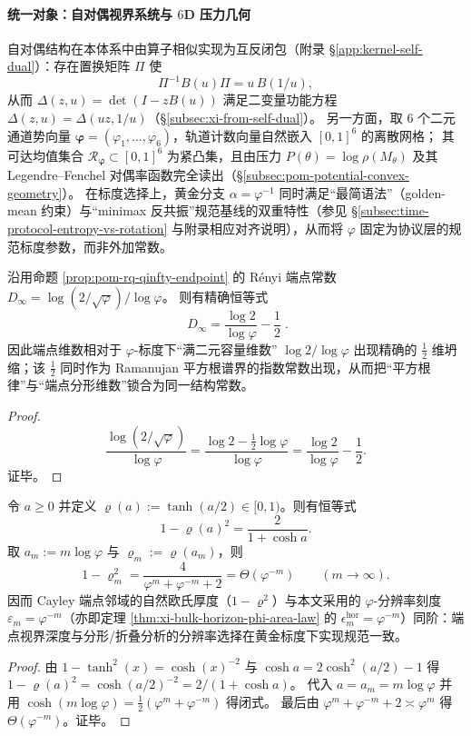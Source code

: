 \paragraph{统一对象：自对偶视界系统与 \(6\)D 压力几何}
自对偶结构在本体系中由算子相似实现为互反闭包（附录 \S\ref{app:kernel-self-dual}）：存在置换矩阵 \(\Pi\) 使
\[
\Pi^{-1}B(u)\Pi=u\,B(1/u),
\]
从而 \(\Delta(z,u)=\det(I-zB(u))\) 满足二变量功能方程 \(\Delta(z,u)=\Delta(uz,1/u)\)（\S\ref{subsec:xi-from-self-dual}）。
另一方面，取 \(6\) 个二元通道势向量 \(\boldsymbol{\varphi}=(\varphi_1,\dots,\varphi_6)\)，轨道计数向量自然嵌入 \([0,1]^6\) 的离散网格；
其可达均值集合 \(\mathcal{R}_{\boldsymbol{\varphi}}\subset[0,1]^6\) 为紧凸集，且由压力 \(P(\theta)=\log\rho(M_\theta)\) 及其 Legendre--Fenchel 对偶率函数完全读出（\S\ref{subsec:pom-potential-convex-geometry}）。
在标度选择上，黄金分支 \(\alpha=\varphi^{-1}\) 同时满足“最简语法”（golden-mean 约束）与“minimax 反共振”规范基线的双重特性（参见 \S\ref{subsec:time-protocol-entropy-vs-rotation} 与附录相应对齐说明），从而将 \(\varphi\) 固定为协议层的规范标度参数，而非外加常数。

\begin{corollary}\label{cor:discussion-ramanujan-half-dimension-collapse}
沿用命题 \ref{prop:pom-rq-qinfty-endpoint} 的 Rényi 端点常数
\(
D_\infty=\log(2/\sqrt{\varphi})/\log\varphi
\)。
则有精确恒等式
\[
\boxed{\;
D_\infty=\frac{\log 2}{\log\varphi}-\frac12\; }.
\]
因此端点维数相对于 \(\varphi\)-标度下“满二元容量维数” \(\log 2/\log\varphi\) 出现精确的 \(\tfrac12\) 维坍缩；该 \(\tfrac12\) 同时作为 Ramanujan 平方根谱界的指数常数出现，从而把“平方根律”与“端点分形维数”锁合为同一结构常数。
\end{corollary}
\begin{proof}
\[
\frac{\log(2/\sqrt{\varphi})}{\log\varphi}
=\frac{\log 2-\tfrac12\log\varphi}{\log\varphi}
=\frac{\log 2}{\log\varphi}-\frac12.
\]
证毕。
\end{proof}

\begin{corollary}\label{cor:discussion-horizon-boundarylayer-phi-scaling}
令 \(a\ge 0\) 并定义 \(\varrho(a):=\tanh(a/2)\in[0,1)\)。则有恒等式
\[
1-\varrho(a)^2=\frac{2}{1+\cosh a}.
\]
取 \(a_m:=m\log\varphi\) 与 \(\varrho_m:=\varrho(a_m)\)，则
\[
1-\varrho_m^2=\frac{4}{\varphi^{m}+\varphi^{-m}+2}
=\Theta(\varphi^{-m})\qquad(m\to\infty).
\]
因而 Cayley 端点邻域的自然欧氏厚度（\(1-\varrho^2\)）与本文采用的 \(\varphi\)-分辨率刻度 \(\varepsilon_m=\varphi^{-m}\)（亦即定理 \ref{thm:xi-bulk-horizon-phi-area-law} 的 \(\epsilon_m^{\mathrm{hor}}=\varphi^{-m}\)）同阶：端点视界深度与分形/折叠分析的分辨率选择在黄金标度下实现规范一致。
\end{corollary}
\begin{proof}
由 \(1-\tanh^2(x)=\cosh(x)^{-2}\) 与 \(\cosh a=2\cosh^2(a/2)-1\) 得
\(
1-\varrho(a)^2=\cosh(a/2)^{-2}=2/(1+\cosh a)
\)。
代入 \(a=a_m=m\log\varphi\) 并用 \(\cosh(m\log\varphi)=\frac12(\varphi^{m}+\varphi^{-m})\) 得闭式。
最后由 \(\varphi^{m}+\varphi^{-m}+2\asymp\varphi^{m}\) 得 \(\Theta(\varphi^{-m})\)。证毕。
\end{proof}

